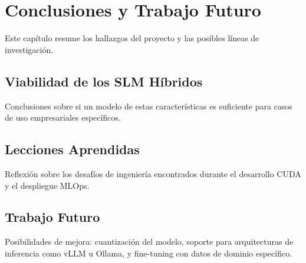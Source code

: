 \section{Conclusiones y Trabajo Futuro}
\label{sec:conclusiones}

Este capítulo resume los hallazgos del proyecto y las posibles líneas de investigación.

\subsection{Viabilidad de los SLM Híbridos}
Conclusiones sobre si un modelo de estas características es suficiente para casos de uso empresariales específicos.

\subsection{Lecciones Aprendidas}
Reflexión sobre los desafíos de ingeniería encontrados durante el desarrollo CUDA y el despliegue MLOps.

\subsection{Trabajo Futuro}
Posibilidades de mejora: cuantización del modelo, soporte para arquitecturas de inferencia como vLLM u Ollama, y fine-tuning con datos de dominio específico.
